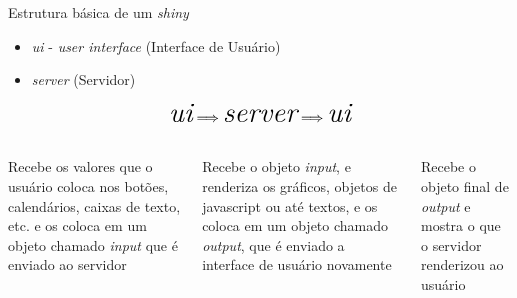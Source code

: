 \documentclass[aspectratio=1610]{beamer}
\begin{document}
\begin{frame}{Estrutura básica de um \textit{shiny}}
    \begin{itemize}
        \item \textit{ui} - \textit{user interface} (Interface de Usuário) \pause
        \item \textit{server} (Servidor) \pause
    \end{itemize}

    \begin{center}
        $$\huge{\textit{ui} \Longrightarrow \textit{server} \Longrightarrow \textit{ui}}$$
    \end{center}

    \pause

    \begin{columns}
        \begin{column}{0.333\textwidth}
            \begin{tcolorbox}[title=Passo 1: \textit{ui},height=5cm,colback=wcprimary10,colbacktitle=wcprimary,colframe=white,fontlower=\small]
                \small{
                Recebe os valores que o usuário coloca nos botões, calendários, caixas de texto, etc. e os coloca em um objeto chamado \textit{input} que é enviado ao servidor
                }
                \vfill
            \end{tcolorbox}    
        \end{column}
        
        \pause
        \begin{column}{0.333\textwidth}
            \begin{tcolorbox}[title=Passo 2: \textit{server},height=5cm,colback=wcprimary10,colbacktitle=wcprimary,colframe=white,fontlower=\small]
                \small{
                Recebe o objeto \textit{input}, e renderiza os gráficos, objetos de javascript ou até textos, e os coloca em um objeto chamado \textit{output}, que é enviado a interface de usuário novamente
                }
                \vfill
            \end{tcolorbox}    
        \end{column}
        
        \pause
        \begin{column}{0.333\textwidth}
            \begin{tcolorbox}[title=Passo 3: \textit{ui},height=5cm,colback=wcprimary10,colbacktitle=wcprimary,colframe=white,fontlower=\small]
                \small{
                Recebe o objeto final de \textit{output} e mostra o que o servidor renderizou ao usuário
                }
                \vfill
            \end{tcolorbox}    
        \end{column}
    \end{columns}
\end{frame}
\end{document}

